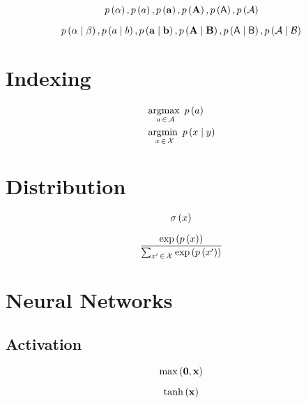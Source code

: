 \documentclass[a4paper,11pt]{article}
\begin{document}
\begin{equation*}
	p\left(\alpha\right),p\left(a\right), p\left(\mathbf{a}\right), p\left(\mathbf{A}\right), p\left(\mathsf{A}\right), p\left(\mathcal{A}\right)
\end{equation*}

\begin{equation*}
	p\left(\alpha\mid \beta\right),p\left(a\mid b\right), p\left(\mathbf{a}\mid \mathbf{b}\right), p\left(\mathbf{A}\mid \mathbf{B}\right), p\left(\mathsf{A}\mid \mathsf{B}\right), p\left(\mathcal{A}\mid \mathcal{B}\right)
\end{equation*}

\section{Indexing} %
\label{sec:indexing}

\begin{align*}
	& \operatorname*{\mathrm{argmax}~}_{a\,\in\,\mathcal{A}}{p\left(a\right)} \\
	& \operatorname*{\mathrm{argmin}~}_{x\,\in\,\mathcal{X}}{p\left(x\mid y\right)} \\
\end{align*}

\section{Distribution} %
\label{sec:distribution}

\begin{equation*}
	\sigma\left(x\right)
\end{equation*}

\begin{equation*}
	\dfrac{\exp\left(p\left(x\right)\right)}{\sum_{x^{\prime}\,\in\,\mathcal{X}} \exp\left(p\left(x^{\prime}\right)\right)}
\end{equation*}



\section{Neural Networks} %
\label{sec:neural_networks}

\subsection{Activation} %
\label{sub:activation}

\begin{equation*}
	\max\left(\mathbf{0},\mathbf{x}\right)
\end{equation*}

\begin{equation}
	\tanh\left(\mathbf{x}\right)
\end{equation}
\end{document}
